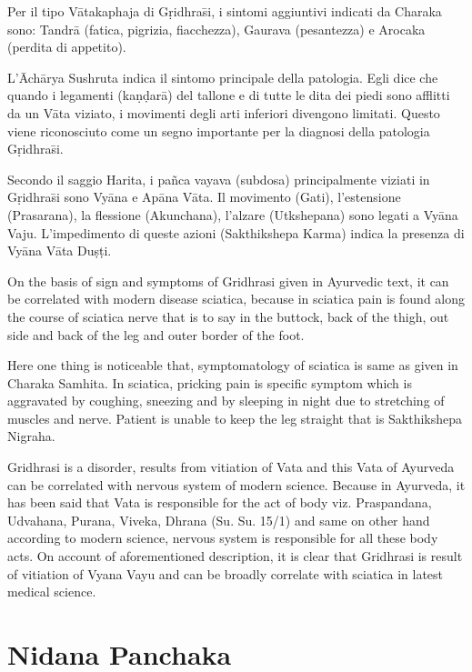 Per il tipo V\={a}takaphaja di G\d{r}idhra\={s}i, i sintomi aggiuntivi indicati da Charaka sono: Tandr\={a} (fatica, pigrizia, fiacchezza), Gaurava (pesantezza) e Arocaka (perdita di appetito).

L'\={A}ch\={a}rya Sushruta indica il sintomo principale della patologia. Egli dice che quando i legamenti (ka\d{n}\d{d}ar\={a}) del tallone e di tutte le dita dei piedi sono afflitti da un V\={a}ta
 viziato, i movimenti degli arti inferiori divengono limitati. Questo viene riconosciuto come un segno importante per la diagnosi della patologia G\d{r}idhra\={s}i\cite{tesi1}. 

Secondo il saggio Harita, i pa\~{n}ca vayava (subdosa) principalmente viziati in G\d{r}idhra\={s}i sono Vy\={a}na e Ap\={a}na V\={a}ta. Il movimento (Gati), l'estensione (Prasarana), la flessione (Akunchana), l'alzare (Utkshepana) sono legati a Vy\={a}na Vaju. L'impedimento di queste azioni (Sakthikshepa Karma) indica la presenza di Vy\={a}na V\={a}ta Du\d{s}\d{t}i. 



On the basis of sign and symptoms of Gridhrasi given in
Ayurvedic text, it can be correlated with modern disease sciatica,
because in sciatica pain is found along the course of sciatica nerve
that is to say in the buttock, back of the thigh, out side and back of
the leg and outer border of the foot.

Here one thing is noticeable that,
symptomatology of sciatica is same as given in Charaka Samhita. In
sciatica, pricking pain is specific symptom which is aggravated by
coughing, sneezing and by sleeping in night due to stretching of
muscles and nerve. Patient is unable to keep the leg straight that is
Sakthikshepa Nigraha.


Gridhrasi is a disorder, results from vitiation of Vata and this
Vata of Ayurveda can be correlated with nervous system of modern
science. Because in Ayurveda, it has been said that Vata is
responsible for the act of body viz. Praspandana, Udvahana, Purana,
Viveka, Dhrana (Su. Su. 15/1) and same on other hand according to
modern science, nervous system is responsible for all these body acts.
On account of aforementioned description, it is clear that
Gridhrasi is result of vitiation of Vyana Vayu and can be broadly
correlate with sciatica in latest medical science.


\section{Nidana Panchaka}


